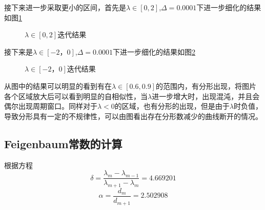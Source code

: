 \documentclass{article}
\begin{document}
接下来进一步采取更小的区间，首先是$ \lambda\in[0,2] $,$ \Delta=0.0001 $下进一步细化的结果如图\ref{fig:2}
 \begin{figure}[!h]
	\centering
	
	\caption{\heiti{}$\lambda\in[0,2]$迭代结果}
	\label{fig:2}
\end{figure}


接下来是$ \lambda\in[-2，0] $,$ \Delta=0.0001 $下进一步细化的结果如图\ref{fig:3}
\begin{figure}[!h]
	\centering
	
	\caption{\heiti{}$\lambda\in[-2，0]$迭代结果}
	\label{fig:3}
\end{figure}


从图中的结果可以明显的看到有在$ \lambda\in[0.6,0.9] $的范围内，有分形出现，将图片各个区域放大后可以看到明显的自相似性，当$ \lambda $进一步增大时，出现混沌，并且会偶尔出现周期窗口。同样对于$ \lambda<0 $的区域，也有分形的出现，但是由于$\lambda$时负值，导致分形具有一定的不规律性，可以由图看出存在分形数减少的曲线断开的情况。

	\subsection{Feigenbaum常数的计算}
	根据方程
	\begin{equation}
		\delta=\frac{\lambda_m-\lambda_{m-1}}{\lambda_{m+1}-\lambda_m}=4.669201
	\end{equation}
	\begin{equation}
		\alpha=\frac{d_m}{d_{m+1}}=2.502908
	\end{equation}
	
\end{document}
